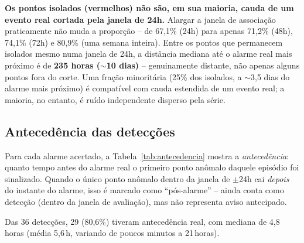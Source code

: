 \documentclass[11pt,a4paper]{article}
\begin{document}
\textbf{Os pontos isolados (vermelhos) não são, em sua maioria, cauda
de um evento real cortada pela janela de 24h.} Alargar a janela de
associação praticamente não muda a proporção -- de 67,1\% (24h) para
apenas 71,2\% (48h), 74,1\% (72h) e 80,9\% (uma semana inteira). Entre
os pontos que permanecem isolados mesmo numa janela de 24h, a distância
mediana até o alarme real mais próximo é de \textbf{235 horas
($\sim$10 dias)} -- genuinamente distante, não apenas alguns pontos fora
do corte. Uma fração minoritária (25\% dos isolados, a $\sim$3,5 dias
do alarme mais próximo) é compatível com cauda estendida de um evento
real; a maioria, no entanto, é ruído independente disperso pela série.

\subsection{Antecedência das detecções}

Para cada alarme acertado, a Tabela~\ref{tab:antecedencia} mostra a
\emph{antecedência}: quanto tempo antes do alarme real o primeiro ponto
anômalo daquele episódio foi sinalizado. Quando o único ponto anômalo
dentro da janela de $\pm$24h cai \emph{depois} do instante do alarme,
isso é marcado como ``pós-alarme'' -- ainda conta como detecção
(dentro da janela de avaliação), mas não representa aviso antecipado.

Das 36 detecções, 29 (80,6\%) tiveram antecedência real, com mediana de
4,8\,horas (média 5,6\,h, variando de poucos minutos a 21\,horas).
\end{document}
